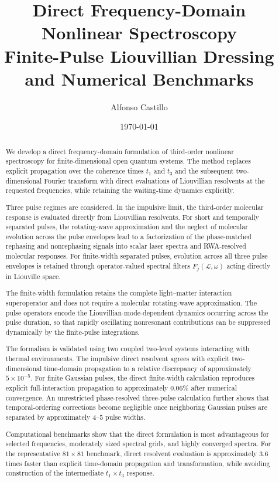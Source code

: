 \documentclass[11pt]{article}
\title{
    \textbf{Direct Frequency-Domain Nonlinear Spectroscopy}\\
    \large Finite-Pulse Liouvillian Dressing and Numerical Benchmarks
}
\author{Alfonso Castillo}
\date{\today}
\begin{document}
\maketitle
\thispagestyle{fancy}

\begin{abstract}

We develop a direct frequency-domain formulation of third-order
nonlinear spectroscopy for finite-dimensional open quantum systems.
The method replaces explicit propagation over the coherence times
$t_1$ and $t_3$ and the subsequent two-dimensional Fourier transform
with direct evaluations of Liouvillian resolvents at the requested
frequencies, while retaining the waiting-time dynamics explicitly.

Three pulse regimes are considered. In the impulsive limit, the
third-order molecular response is evaluated directly from Liouvillian
resolvents. For short and temporally separated pulses, the
rotating-wave approximation and the neglect of molecular evolution
across the pulse envelopes lead to a factorization of the
phase-matched rephasing and nonrephasing signals into scalar laser
spectra and RWA-resolved molecular responses. For finite-width
separated pulses, evolution across all three pulse envelopes is
retained through operator-valued spectral filters
$F_j(\mathcal{L},\omega)$ acting directly in Liouville space.

The finite-width formulation retains the complete light--matter
interaction superoperator and does not require a molecular
rotating-wave approximation. The pulse operators encode the
Liouvillian-mode-dependent dynamics occurring across the pulse
duration, so that rapidly oscillating nonresonant contributions can be
suppressed dynamically by the finite-pulse integrations.

The formalism is validated using two coupled two-level systems
interacting with thermal environments. The impulsive direct resolvent
agrees with explicit two-dimensional time-domain propagation to a
relative discrepancy of approximately $5\times10^{-5}$. For finite
Gaussian pulses, the direct finite-width calculation reproduces
explicit full-interaction propagation to approximately $0.06\%$ after
numerical convergence. An unrestricted phase-resolved three-pulse
calculation further shows that temporal-ordering corrections become
negligible once neighboring Gaussian pulses are separated by
approximately $4$--$5$ pulse widths.

Computational benchmarks show that the direct formulation is most
advantageous for selected frequencies, moderately sized spectral
grids, and highly converged spectra. For the representative
$81\times81$ benchmark, direct resolvent evaluation is approximately
$3.6$ times faster than explicit time-domain propagation and
transformation, while avoiding construction of the intermediate
$t_1\times t_3$ response.

\end{abstract}
\end{document}

